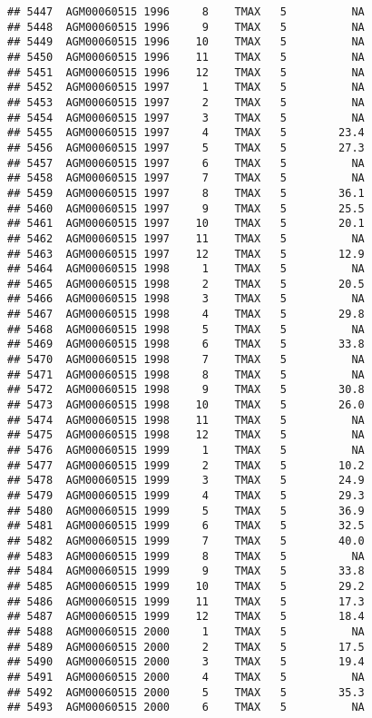 \documentclass{article}\usepackage[]{graphicx}\usepackage[]{color}
\makeatletter
\newenvironment{kframe}{%
 \def\at@end@of@kframe{}%
 \ifinner\ifhmode%
  \def\at@end@of@kframe{\end{minipage}}%
  \begin{minipage}{\columnwidth}%
 \fi\fi%
 \def\FrameCommand##1{\hskip\@totalleftmargin \hskip-\fboxsep
 \colorbox{shadecolor}{##1}\hskip-\fboxsep
     \hskip-\linewidth \hskip-\@totalleftmargin \hskip\columnwidth}%
 \MakeFramed {\advance\hsize-\width
   \@totalleftmargin\z@ \linewidth\hsize
   \@setminipage}}%
 {\par\unskip\endMakeFramed%
 \at@end@of@kframe}
\newenvironment{knitrout}{}{} %
\makeatother
\begin{document}
\begin{knitrout}
\begin{kframe}
\begin{verbatim}
## 5447  AGM00060515 1996     8    TMAX   5          NA
## 5448  AGM00060515 1996     9    TMAX   5          NA
## 5449  AGM00060515 1996    10    TMAX   5          NA
## 5450  AGM00060515 1996    11    TMAX   5          NA
## 5451  AGM00060515 1996    12    TMAX   5          NA
## 5452  AGM00060515 1997     1    TMAX   5          NA
## 5453  AGM00060515 1997     2    TMAX   5          NA
## 5454  AGM00060515 1997     3    TMAX   5          NA
## 5455  AGM00060515 1997     4    TMAX   5        23.4
## 5456  AGM00060515 1997     5    TMAX   5        27.3
## 5457  AGM00060515 1997     6    TMAX   5          NA
## 5458  AGM00060515 1997     7    TMAX   5          NA
## 5459  AGM00060515 1997     8    TMAX   5        36.1
## 5460  AGM00060515 1997     9    TMAX   5        25.5
## 5461  AGM00060515 1997    10    TMAX   5        20.1
## 5462  AGM00060515 1997    11    TMAX   5          NA
## 5463  AGM00060515 1997    12    TMAX   5        12.9
## 5464  AGM00060515 1998     1    TMAX   5          NA
## 5465  AGM00060515 1998     2    TMAX   5        20.5
## 5466  AGM00060515 1998     3    TMAX   5          NA
## 5467  AGM00060515 1998     4    TMAX   5        29.8
## 5468  AGM00060515 1998     5    TMAX   5          NA
## 5469  AGM00060515 1998     6    TMAX   5        33.8
## 5470  AGM00060515 1998     7    TMAX   5          NA
## 5471  AGM00060515 1998     8    TMAX   5          NA
## 5472  AGM00060515 1998     9    TMAX   5        30.8
## 5473  AGM00060515 1998    10    TMAX   5        26.0
## 5474  AGM00060515 1998    11    TMAX   5          NA
## 5475  AGM00060515 1998    12    TMAX   5          NA
## 5476  AGM00060515 1999     1    TMAX   5          NA
## 5477  AGM00060515 1999     2    TMAX   5        10.2
## 5478  AGM00060515 1999     3    TMAX   5        24.9
## 5479  AGM00060515 1999     4    TMAX   5        29.3
## 5480  AGM00060515 1999     5    TMAX   5        36.9
## 5481  AGM00060515 1999     6    TMAX   5        32.5
## 5482  AGM00060515 1999     7    TMAX   5        40.0
## 5483  AGM00060515 1999     8    TMAX   5          NA
## 5484  AGM00060515 1999     9    TMAX   5        33.8
## 5485  AGM00060515 1999    10    TMAX   5        29.2
## 5486  AGM00060515 1999    11    TMAX   5        17.3
## 5487  AGM00060515 1999    12    TMAX   5        18.4
## 5488  AGM00060515 2000     1    TMAX   5          NA
## 5489  AGM00060515 2000     2    TMAX   5        17.5
## 5490  AGM00060515 2000     3    TMAX   5        19.4
## 5491  AGM00060515 2000     4    TMAX   5          NA
## 5492  AGM00060515 2000     5    TMAX   5        35.3
## 5493  AGM00060515 2000     6    TMAX   5          NA

\end{verbatim}
\end{kframe}
\end{knitrout}
\end{document}
